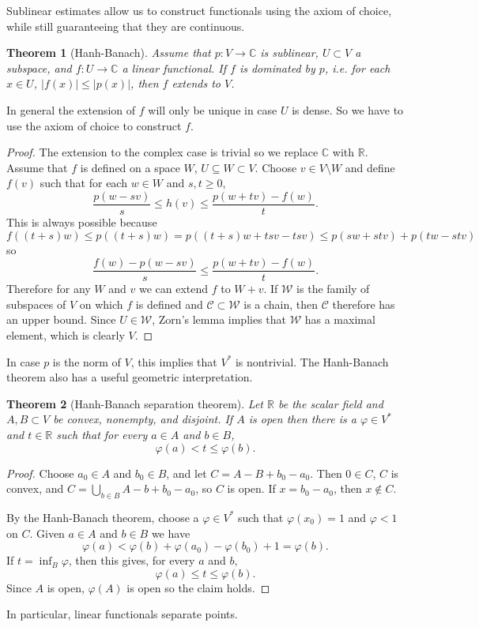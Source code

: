 \documentclass[12pt]{report}
\newcommand{\RR}{\mathbb{R}}
\newcommand{\CC}{\mathbb{C}}
\newtheorem{theorem}{Theorem}[chapter]
\theoremstyle{definition}
\begin{document}
    Sublinear estimates allow us to construct functionals using the axiom of choice, while still guaranteeing that they are continuous.
\begin{theorem}[Hanh-Banach]
    Assume that $p: V \to \CC$ is sublinear, $U \subset V$ a subspace, and $f: U \to \CC$ a linear functional. If $f$ is dominated by $p$, i.e. for each $x \in U$, $|f(x)| \leq |p(x)|$, then $f$ extends to $V$.
\end{theorem}
    In general the extension of $f$ will only be unique in case $U$ is dense. So we have to use the axiom of choice to construct $f$.
\begin{proof}
    The extension to the complex case is trivial so we replace $\CC$ with $\RR$. Assume that $f$ is defined on a space $W$, $U \subseteq W \subset V$. Choose $v \in V \setminus W$ and define $f(v)$ such that for each $w \in W$ and $s,t \geq 0$,
$$\frac{p(w-sv)}{s} \leq h(v) \leq \frac{p(w+tv) - f(w)}{t}.$$
    This is always possible because
    $$f((t+s)w) \leq p((t+s)w) = p((t+s)w + tsv - tsv) \leq p(sw + stv) + p(tw - stv)$$
    so
    $$\frac{f(w) - p(w - sv)}{s} \leq \frac{p(w+tv) - f(w)}{t}.$$
    Therefore for any $W$ and $v$ we can extend $f$ to $W + v$. If $\mathcal W$ is the family of subspaces of $V$ on which $f$ is defined and $\mathcal C \subset \mathcal W$ is a chain, then $\mathcal C$ therefore has an upper bound. Since $U \in \mathcal W$, Zorn's lemma implies that $\mathcal W$ has a maximal element, which is clearly $V$.
\end{proof}
    In case $p$ is the norm of $V$, this implies that $V^*$ is nontrivial. The Hanh-Banach theorem also has a useful geometric interpretation.
\begin{theorem}[Hanh-Banach separation theorem]
    Let $\RR$ be the scalar field and $A, B \subset V$ be convex, nonempty, and disjoint. If $A$ is open then there is a $\varphi \in V^*$ and $t \in \RR$ such that for every $a \in A$ and $b \in B$,
    $$\varphi(a) < t \leq \varphi(b).$$
\end{theorem}
\begin{proof}
    Choose $a_0 \in A$ and $b_0 \in B$, and let $C = A - B + b_0 - a_0$. Then $0 \in C$, $C$ is convex, and $C = \bigcup_{b \in B} A - b + b_0 - a_0$, so $C$ is open. If $x = b_0 - a_0$, then $x \notin C$.
    
    By the Hanh-Banach theorem, choose a $\varphi \in V^*$ such that $\varphi(x_0) = 1$ and $\varphi < 1$ on $C$. Given $a \in A$ and $b \in B$ we have
    $$\varphi(a) < \varphi(b) + \varphi(a_0) - \varphi(b_0) + 1 = \varphi(b).$$
    If $t = \inf_B \varphi$, then this gives, for every $a$ and $b,$
    $$\varphi(a) \leq t \leq \varphi(b).$$
    Since $A$ is open, $\varphi(A)$ is open so the claim holds.
\end{proof}
    In particular, linear functionals separate points.
\end{document}
